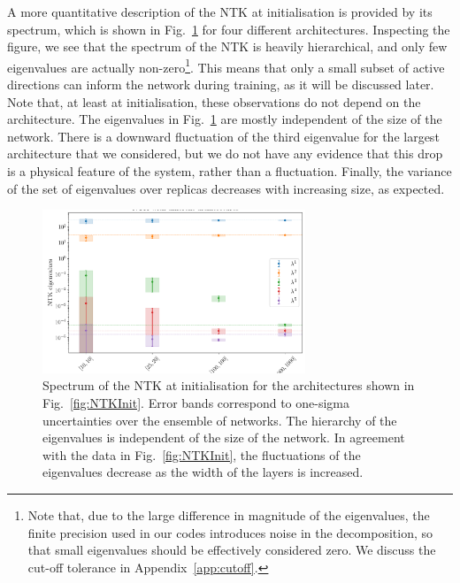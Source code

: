 A more quantitative description of the NTK at initialisation is provided by its
spectrum, which is shown in Fig.~\ref{fig:NTKSpectrum} for four different
architectures. Inspecting the figure, we see that the spectrum of the NTK is
heavily hierarchical, and only few eigenvalues are actually
non-zero\footnote{Note that, due to the large difference in magnitude of the
eigenvalues, the finite precision used in our codes introduces noise in the
decomposition, so that small eigenvalues should be effectively considered zero.
We discuss the cut-off tolerance in Appendix~\ref{app:cutoff}.}. This means that
only a small subset of active directions can inform the network during training,
as it will be discussed later. Note that, at least at initialisation, these
observations do not depend on the architecture. The eigenvalues in
Fig.~\ref{fig:NTKSpectrum} are mostly independent of the size of the network.
There is a downward fluctuation of the third eigenvalue for the largest
architecture that we considered, but we do not have any evidence that this drop
is a physical feature of the system, rather than a fluctuation. Finally, the
variance of the set of eigenvalues over replicas decreases with increasing size,
as expected. 

\begin{figure}[t]
  \centering
  \includegraphics[width=0.7\textwidth]{figs/section_3/ntk_initialization_arch.pdf}
  \caption{Spectrum of the NTK at initialisation for the architectures shown in
  Fig.~\ref{fig:NTKInit}. Error bands correspond to one-sigma uncertainties over
  the ensemble of networks. The hierarchy of the eigenvalues is independent of the size
  of the network. In agreement with the data in Fig.~\ref{fig:NTKInit}, the fluctuations 
  of the eigenvalues decrease as the width of the layers is increased. 
  }
  \label{fig:NTKSpectrum}
\end{figure}


